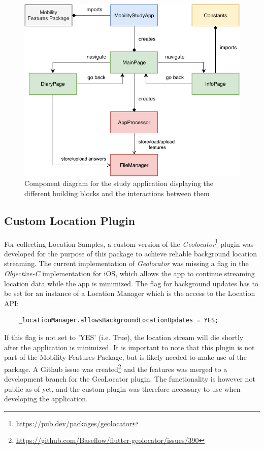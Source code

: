 \begin{figure}
    \centering
    \includegraphics[width=\textwidth]{images/diagrams/app-diagram.pdf}
    \caption{Component diagram for the study application displaying the different building blocks and the interactions between them}
    \label{fig:app-component-diagram}
\end{figure}

\subsection{Custom Location Plugin}
For collecting Location Samples, a custom version of the \textit{Geolocator}\footnote{\url{https://pub.dev/packages/geolocator}} plugin was developed for the purpose of this package to achieve reliable background location streaming. The current implementation of \textit{Geolocator} was missing a flag in the \textit{Objective-C} implementation for iOS, which allows the app to continue streaming location data while the app is minimized. The flag for background updates has to be set for an instance of a Location Manager which is the access to the Location API:

\begin{verbatim}
    _locationManager.allowsBackgroundLocationUpdates = YES;
\end{verbatim}

If this flag is not set to 'YES' (i.e. True), the location stream will die shortly after the application is minimized. It is important to note that this plugin is not part of the Mobility Features Package, but is likely needed to make use of the package. A Github issue was created\footnote{\url{https://github.com/Baseflow/flutter-geolocator/issues/390}} and the features was merged to a development branch for the GeoLocator plugin. The functionality is however not public as of yet, and the custom plugin was therefore necessary to use when developing the application. 

